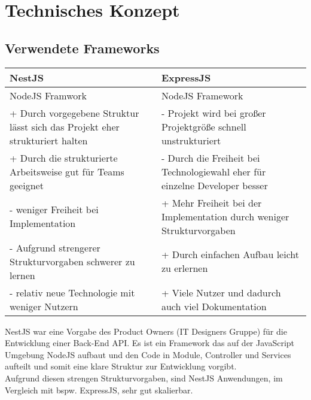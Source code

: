 \section{Technisches Konzept}

\subsection{Verwendete Frameworks}

\begin{table}[!h]
    \centering
    \begin{tabular}{|l|l|} 
    \hline
    NestJS                                                                       & ExpressJS                                                                    \\ 
    \hline
    NodeJS Framwork                                                              & NodeJS Framework                                                             \\ 
    \hline
    + Durch vorgegebene Struktur lässt sich das Projekt eher strukturiert halten & - Projekt wird bei großer Projektgröße schnell unstrukturiert                \\ 
    \hline
    + Durch die strukturierte Arbeitsweise gut für Teams geeignet                & - Durch die Freiheit bei Technologiewahl eher für einzelne Developer besser  \\ 
    \hline
    - weniger Freiheit bei Implementation                                        & + Mehr Freiheit bei der Implementation durch weniger Strukturvorgaben        \\ 
    \hline
    - Aufgrund strengerer Strukturvorgaben schwerer zu lernen                    & + Durch einfachen Aufbau leicht zu erlernen                                  \\ 
    \hline
    - relativ neue Technologie mit weniger Nutzern                               & + Viele Nutzer und dadurch auch viel Dokumentation                           \\
    \hline
    \end{tabular}
    \end{table}

NestJS war eine Vorgabe des Product Owners (IT Designers Gruppe) für die Entwicklung einer Back-End API. 
Es ist ein Framework das auf der JavaScript Umgebung NodeJS aufbaut und den Code in Module, Controller und Services aufteilt und somit eine klare Struktur zur Entwicklung vorgibt.\\
Aufgrund diesen strengen Strukturvorgaben, sind NestJS Anwendungen, im Vergleich mit bspw. ExpressJS, sehr gut skalierbar.



